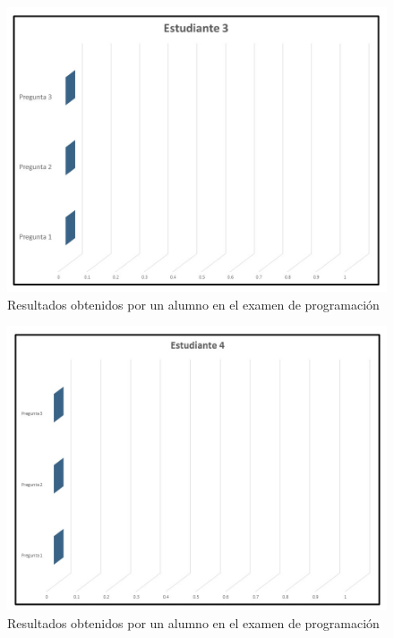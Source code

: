 \documentclass[12pt] {report}
\begin{document}
\begin{figure}[H]
\centering 
\includegraphics[scale=.4]{PEstudiante3.JPG}
\caption{Resultados obtenidos por un alumno en el examen de programación}
\end{figure}

\begin{figure}[H]
\centering 
\includegraphics[scale=.4]{PEstudiante4.JPG}
\caption{Resultados obtenidos por un alumno en el examen de programación}
\end{figure}
\end{document}
